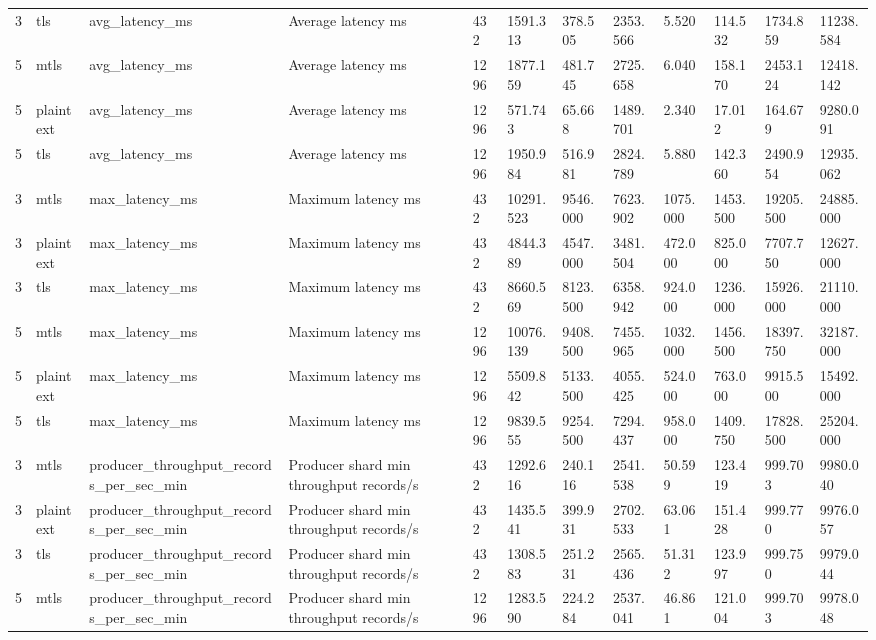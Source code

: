 \begin{longtable}{llllllllllll}
3 & tls & avg\_latency\_ms & Average latency ms & 432 & 1591.313 & 378.505 & 2353.566 & 5.520 & 114.532 & 1734.859 & 11238.584 \\
5 & mtls & avg\_latency\_ms & Average latency ms & 1296 & 1877.159 & 481.745 & 2725.658 & 6.040 & 158.170 & 2453.124 & 12418.142 \\
5 & plaintext & avg\_latency\_ms & Average latency ms & 1296 & 571.743 & 65.668 & 1489.701 & 2.340 & 17.012 & 164.679 & 9280.091 \\
5 & tls & avg\_latency\_ms & Average latency ms & 1296 & 1950.984 & 516.981 & 2824.789 & 5.880 & 142.360 & 2490.954 & 12935.062 \\
3 & mtls & max\_latency\_ms & Maximum latency ms & 432 & 10291.523 & 9546.000 & 7623.902 & 1075.000 & 1453.500 & 19205.500 & 24885.000 \\
3 & plaintext & max\_latency\_ms & Maximum latency ms & 432 & 4844.389 & 4547.000 & 3481.504 & 472.000 & 825.000 & 7707.750 & 12627.000 \\
3 & tls & max\_latency\_ms & Maximum latency ms & 432 & 8660.569 & 8123.500 & 6358.942 & 924.000 & 1236.000 & 15926.000 & 21110.000 \\
5 & mtls & max\_latency\_ms & Maximum latency ms & 1296 & 10076.139 & 9408.500 & 7455.965 & 1032.000 & 1456.500 & 18397.750 & 32187.000 \\
5 & plaintext & max\_latency\_ms & Maximum latency ms & 1296 & 5509.842 & 5133.500 & 4055.425 & 524.000 & 763.000 & 9915.500 & 15492.000 \\
5 & tls & max\_latency\_ms & Maximum latency ms & 1296 & 9839.555 & 9254.500 & 7294.437 & 958.000 & 1409.750 & 17828.500 & 25204.000 \\
3 & mtls & producer\_throughput\_records\_per\_sec\_min & Producer shard min throughput records/s & 432 & 1292.616 & 240.116 & 2541.538 & 50.599 & 123.419 & 999.703 & 9980.040 \\
3 & plaintext & producer\_throughput\_records\_per\_sec\_min & Producer shard min throughput records/s & 432 & 1435.541 & 399.931 & 2702.533 & 63.061 & 151.428 & 999.770 & 9976.057 \\
3 & tls & producer\_throughput\_records\_per\_sec\_min & Producer shard min throughput records/s & 432 & 1308.583 & 251.231 & 2565.436 & 51.312 & 123.997 & 999.750 & 9979.044 \\
5 & mtls & producer\_throughput\_records\_per\_sec\_min & Producer shard min throughput records/s & 1296 & 1283.590 & 224.284 & 2537.041 & 46.861 & 121.004 & 999.703 & 9978.048 \\

\end{longtable}

